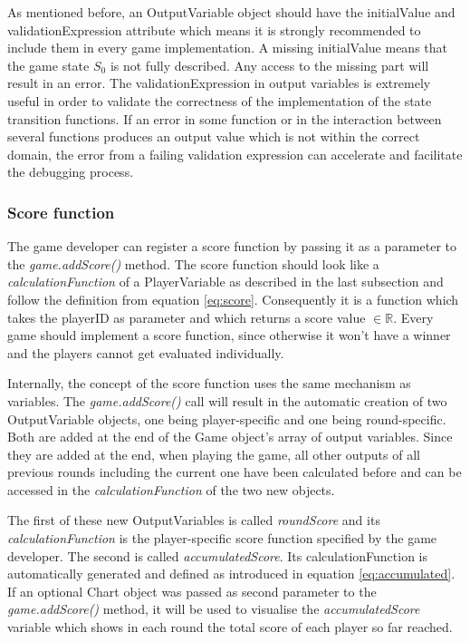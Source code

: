 As mentioned before, an OutputVariable object should have the initialValue and \newline 
\mbox{validationExpression} attribute which means it is strongly recommended to include them in every game implementation. A missing initialValue means that the game state $S_0$ is not fully described. Any access to the missing part will result in an error. The validationExpression in output variables is extremely useful in order to validate the correctness of the implementation of the state transition functions. If an error in some function or in the interaction between several functions produces an output value which is not within the correct domain, the error from a failing validation expression can accelerate and facilitate the debugging process.

\subsubsection{Score function}
\label{subsub:score}

The game developer can register a score function by passing it as a parameter to the \newline \textit{game.addScore()} method. The score function should look like a \textit{calculationFunction} of a PlayerVariable as described in the last subsection and follow the definition from equation \ref{eq:score}. Consequently it is a function which takes the playerID as parameter and which returns a score value $\in \mathbb{R}$. Every game should implement a score function, since otherwise it won't have a winner and the players cannot get evaluated individually.

Internally, the concept of the score function uses the same mechanism as variables. The \newline \textit{game.addScore()} call will result in the automatic creation of two OutputVariable objects, one being player-specific and one being round-specific. Both are added at the end of the Game object's array of output variables. Since they are added at the end, when playing the game, all other outputs of all previous rounds including the current one have been calculated before and can be accessed in the \textit{calculationFunction} of the two new objects.

The first of these new OutputVariables is called \textit{roundScore} and its \textit{calculationFunction} is the player-specific score function specified by the game developer. The second is called \textit{accumulatedScore}. Its calculationFunction is automatically generated and defined as introduced in equation \ref{eq:accumulated}. If an optional Chart object was passed as second parameter to the \textit{game.addScore()} method, it will be used to visualise the \textit{accumulatedScore} variable which shows in each round the total score of each player so far reached.

